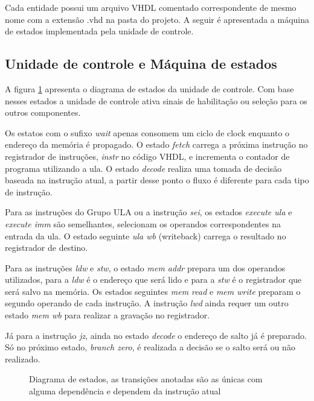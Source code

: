 \documentclass[a4paper, 12pt]{article}
\begin{document}
\par
Cada entidade possui um arquivo VHDL comentado correspondente de mesmo nome com a extensão .vhd na pasta do projeto.
A seguir é apresentada a máquina de estados implementada pela unidade de controle.

\subsection{Unidade de controle e Máquina de estados}

A figura \ref{fig:states} apresenta o diagrama de estados da unidade de controle.
Com base nesses estados a unidade de controle ativa sinais de habilitação ou seleção
para os outros componentes.

Os estatos com o sufixo \textit{wait} apenas consomem um ciclo de clock enquanto o endereço da memória é propagado.
O estado \textit{fetch} carrega a próxima instrução no registrador de instruções, \textit{instr} no código VHDL,
e incrementa o contador de programa utilizando a ula.
O estado \textit{decode} realiza uma tomada de decisão baseada na instrução atual, a partir desse ponto o fluxo 
é diferente para cada tipo de instrução.

Para as instruções do Grupo ULA ou a instrução \textit{sei}, os estados \textit{execute ula} e \textit{execute imm} são semelhantes,
selecionam os operandos correspondentes na entrada da ula. O estado seguinte \textit{ula wb} (writeback) carrega o resultado no registrador
de destino. 

Para as instruções \textit{ldw} e \textit{stw}, o estado \textit{mem addr} prepara um dos operandos utilizados,
para a \textit{ldw} é o endereço que será lido e para a \textit{stw} é o registrador que será salvo na memória.
Os estados seguintes \textit{mem read} e \textit{mem write} preparam o segundo operando de cada instrução.
A instrução \textit{lwd} ainda requer um outro estado \textit{mem wb} para realizar a gravação no registrador.

Já para a instrução \textit{jz}, ainda no estado \textit{decode} o endereço de salto já é preparado.
Só no próximo estado, \textit{branch zero}, é realizada a decisão se o salto será ou não realizado. 

\begin{figure}[ht]
	\centering
    \def\svgwidth{\columnwidth}
    
	\caption{Diagrama de estados, as transições anotadas são as únicas com alguma dependência e dependem da instrução atual}
	\label{fig:states}
\end{figure}
\end{document}
